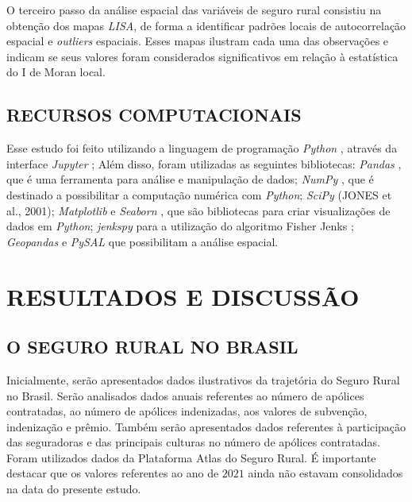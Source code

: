 O terceiro passo da análise espacial das variáveis de seguro rural consistiu na obtenção dos mapas \textit{LISA}, de forma a identificar padrões locais de autocorrelação espacial e \textit{outliers} espaciais. Esses mapas ilustram cada uma das observações e indicam se seus valores foram considerados significativos em relação à estatística do I de Moran local. 

\subsection{RECURSOS COMPUTACIONAIS}  
Esse estudo foi feito utilizando a linguagem de programação \textit{Python} \cite{python17}, através da interface \textit{Jupyter} \cite{jupyter17} \cite{perez07} \cite{kluyver19};
Além disso, foram utilizadas as seguintes bibliotecas: 
\textit{Pandas} \cite{mckinney10}, que é uma ferramenta  para análise e manipulação de dados;
\textit{NumPy} \cite{walt11}, que é destinado a possibilitar a computação numérica com \textit{Python};
\textit{SciPy} (JONES et al., 2001); %
\textit{Matplotlib} \cite{hunter07} e \textit{Seaborn} \cite{waskom14}, que são bibliotecas para criar visualizações  de dados em \textit{Python};
\textit{jenkspy} para a utilização do algoritmo Fisher Jenks \cite{jenks77};
\textit{Geopandas} \cite{jordahl14} e \textit{PySAL} \cite{rey07} que possibilitam a análise espacial.


\section{RESULTADOS E DISCUSSÃO}

\subsection{O SEGURO RURAL NO BRASIL} 

Inicialmente, serão apresentados dados ilustrativos da trajetória do Seguro Rural no Brasil. Serão analisados dados anuais referentes ao número de apólices contratadas, ao número de apólices indenizadas, aos valores de subvenção, indenização e prêmio. Também serão apresentados dados referentes à participação das seguradoras e das principais culturas no número de apólices contratadas. Foram utilizados dados da Plataforma Atlas do Seguro Rural. É importante destacar que os valores referentes ao ano de $2021$ ainda não estavam consolidados na data do presente estudo.

